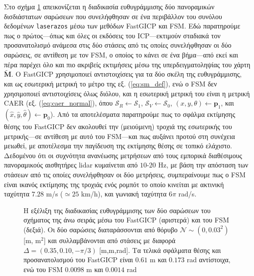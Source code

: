 Στο σχήμα \ref{fig:02_05_04:01} απεικονίζεται η διαδικασία ευθυγράμμισης δύο
πανοραμικών δισδιάστατων σαρώσεων που συνελήφθησαν σε ένα περιβάλλον του συνόλου
δεδομένων \texttt{laserazos} μέσω των μεθόδων FastGICP
και FSM.  Εδώ παρατηρούμε πως ο πρώτος---όπως και όλες οι εκδόσεις του
ICP---εκτιμούν σταδιακά τον προσανατολισμό ανάμεσα στις δύο στάσεις από τις
οποίες συνελήφθησαν οι δύο σαρώσεις, σε αντίθεση με τον FSM, ο οποίος το κάνει
σε ένα βήμα---από εκεί και πέρα παρέχει όλο και πιο ακριβείς εκτιμήσεις μέσω
της υπερδειγματοληψίας του χάρτη $\widetilde{\bm{M}}$. Ο FastGICP χρησιμοποιεί
αντιστοιχίσεις για τα δύο σκέλη της ευθυγράμμισης, και ως εσωτερική μετρική το
μέτρο της εξ. (\ref{eq:sm_def}), ενώ ο FSM δεν χρησιμοποιεί αντιστοιχίσεις
όλως διόλου, και η εσωτερική μετρική του είναι η μετρική CAER (εξ.
(\ref{eq:caer_normal}), όπου $\mathcal{S}_R \leftarrow \mathcal{S}_1$,
$\mathcal{S}_V \leftarrow \mathcal{S}_0$, $(x,y,\theta)\leftarrow\bm{p}_1$, και
$(\hat{x}, \hat{y}, \hat{\theta}) \leftarrow \bm{p}_0$). Από τα αποτελέσματα
παρατηρούμε πως το σφάλμα εκτίμησης θέσης του FastGICP δεν ακολουθεί την
(μειούμενη) τροχιά της εσωτερικής του μετρικής---σε αντίθεση με αυτό του
FSM---και πως αυξάνει προτού στη συνέχεια μειωθεί, με αποτέλεσμα την
παγίδευση της εκτίμησης θέσης σε τοπικό ελάχιστο. Δεδομένου ότι οι συχνότητα
ανανέωσης μετρήσεων από τους εμπορικά διαθέσιμους πανοραμικούς αισθητήρες lidar
κυμαίνεται από $10$-$20$ Hz, με βάση την απόσταση των στάσεων από τις οποίες
συνελήφθησαν οι δύο μετρήσεις, συμπεραίνουμε πως ο FSM είναι ικανός εκτίμησης
της τροχιάς ενός ρομπότ το οποίο κινείται με ακτινική ταχύτητα $7.28$ m/s
($\simeq 25$ km/h), και γωνιακή ταχύτητα $6\pi$ rad/s.

\begin{figure}[]\centering
  
  \vspace{0.5cm}
  \caption{\small Η εξέλιξη της διαδικασίας ευθυγράμμισης των δύο σαρώσεων του
           σχήματος της άνω σειράς μέσω του FastGICP (αριστερά) και του
           FSM (δεξιά). Οι δύο σαρώσεις διαταράσσονται από θόρυβο
           $\mathcal{N} \sim (0, 0.03^2)$ [m, m$^2$] και συλλαμβάνονται από
           στάσεις με διαφορά $\Delta = (0.35, 0.10, -\pi/3)$ [m,m,rad].
           Τα τελικά σφάλματα θέσης και προσανατολισμού του FastGICP είναι
           $0.61$ m και $0.173$ rad αντίστοιχα, ενώ του FSM
           $0.0098$ m και $0.0014$ rad}
  \label{fig:02_05_04:01}
\end{figure}


